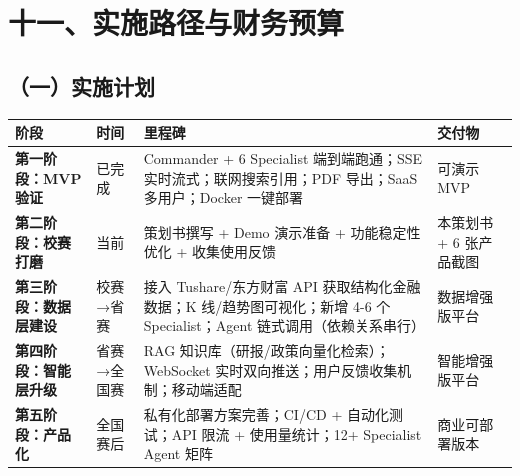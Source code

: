 \documentclass[
]{ctexart}
\begin{document}
\section{十一、实施路径与财务预算}\label{ux5341ux4e00ux5b9eux65bdux8defux5f84ux4e0eux8d22ux52a1ux9884ux7b97}

\subsection{（一）实施计划}\label{ux4e00ux5b9eux65bdux8ba1ux5212}

\begin{longtable}[]{@{}
  >{\raggedright\arraybackslash}p{}
  >{\raggedright\arraybackslash}p{}
  >{\raggedright\arraybackslash}p{}
  >{\raggedright\arraybackslash}p{}@{}}
\toprule\noalign{}
\begin{minipage}[b]{\linewidth}\raggedright
阶段
\end{minipage} & \begin{minipage}[b]{\linewidth}\raggedright
时间
\end{minipage} & \begin{minipage}[b]{\linewidth}\raggedright
里程碑
\end{minipage} & \begin{minipage}[b]{\linewidth}\raggedright
交付物
\end{minipage} \\
\midrule\noalign{}
\endhead
\bottomrule\noalign{}
\endlastfoot
\textbf{第一阶段：MVP 验证} & 已完成 & Commander + 6 Specialist
端到端跑通；SSE 实时流式；联网搜索引用；PDF 导出；SaaS 多用户；Docker
一键部署 & 可演示 MVP \\
\textbf{第二阶段：校赛打磨} & 当前 & 策划书撰写 + Demo 演示准备 +
功能稳定性优化 + 收集使用反馈 & 本策划书 + 6 张产品截图 \\
\textbf{第三阶段：数据层建设} & 校赛→省赛 & 接入 Tushare/东方财富 API
获取结构化金融数据；K 线/趋势图可视化；新增 4-6 个 Specialist；Agent
链式调用（依赖关系串行） & 数据增强版平台 \\
\textbf{第四阶段：智能层升级} & 省赛→全国赛 & RAG
知识库（研报/政策向量化检索）；WebSocket
实时双向推送；用户反馈收集机制；移动端适配 & 智能增强版平台 \\
\textbf{第五阶段：产品化} & 全国赛后 & 私有化部署方案完善；CI/CD +
自动化测试；API 限流 + 使用量统计；12+ Specialist Agent 矩阵 &
商业可部署版本 \\
\end{longtable}
\end{document}
